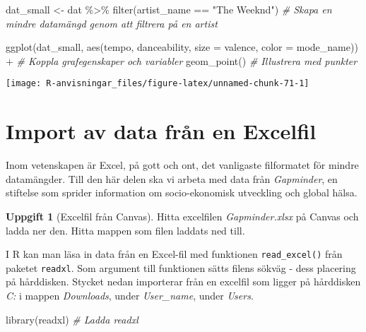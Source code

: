 \documentclass[
]{book}
\newenvironment{Shaded}{\begin{snugshade}}{\end{snugshade}}
\newcommand{\AttributeTok}[1]{\textcolor[rgb]{0.77,0.63,0.00}{#1}}
\newcommand{\CommentTok}[1]{\textcolor[rgb]{0.56,0.35,0.01}{\textit{#1}}}
\newcommand{\FunctionTok}[1]{\textcolor[rgb]{0.00,0.00,0.00}{#1}}
\newcommand{\NormalTok}[1]{#1}
\newcommand{\OtherTok}[1]{\textcolor[rgb]{0.56,0.35,0.01}{#1}}
\newcommand{\SpecialCharTok}[1]{\textcolor[rgb]{0.00,0.00,0.00}{#1}}
\newcommand{\StringTok}[1]{\textcolor[rgb]{0.31,0.60,0.02}{#1}}
\theoremstyle{definition}
\theoremstyle{definition}
\theoremstyle{definition}
\newtheorem{exercise}{Uppgift}[chapter]
\theoremstyle{definition}
\theoremstyle{remark}
\begin{document}
\begin{Shaded}
\begin{Highlighting}[]
\NormalTok{dat\_small }\OtherTok{\textless{}{-}}\NormalTok{ dat }\SpecialCharTok{\%\textgreater{}\%} \FunctionTok{filter}\NormalTok{(artist\_name }\SpecialCharTok{==} \StringTok{"The Weeknd"}\NormalTok{)                            }\CommentTok{\# Skapa en mindre datamängd genom att filtrera på en artist}

\FunctionTok{ggplot}\NormalTok{(dat\_small, }\FunctionTok{aes}\NormalTok{(tempo, danceability, }\AttributeTok{size =}\NormalTok{ valence, }\AttributeTok{color =}\NormalTok{ mode\_name)) }\SpecialCharTok{+}    \CommentTok{\# Koppla grafegenskaper och variabler}
  \FunctionTok{geom\_point}\NormalTok{()                                                                      }\CommentTok{\# Illustrera med punkter}
\end{Highlighting}
\end{Shaded}

\begin{center}\texttt{[image: R-anvisningar\_files/figure-latex/unnamed-chunk-71-1]} \end{center}

\hypertarget{import-av-data-fruxe5n-en-excelfil}{%
\section{Import av data från en Excelfil}\label{import-av-data-fruxe5n-en-excelfil}}

Inom vetenskapen är Excel, på gott och ont, det vanligaste filformatet för mindre datamängder. Till den här delen ska vi arbeta med data från \emph{Gapminder}, en stiftelse som sprider information om socio-ekonomisk utveckling och global hälsa.

\begin{exercise}[Excelfil från Canvas]
Hitta excelfilen \emph{Gapminder.xlsx} på Canvas och ladda ner den. Hitta mappen som filen laddats ned till.
\end{exercise}

I R kan man läsa in data från en Excel-fil med funktionen \texttt{read\_excel()} från paketet \texttt{readxl}. Som argument till funktionen sätts filens sökväg - dess placering på hårddisken. Stycket nedan importerar från en excelfil som ligger på hårddisken \emph{C:} i mappen \emph{Downloads}, under \emph{User\_name}, under \emph{Users}.

\begin{Shaded}
\begin{Highlighting}[]
\FunctionTok{library}\NormalTok{(readxl)                                                           }\CommentTok{\# Ladda readxl}
\end{Highlighting}
\end{Shaded}
\end{document}
